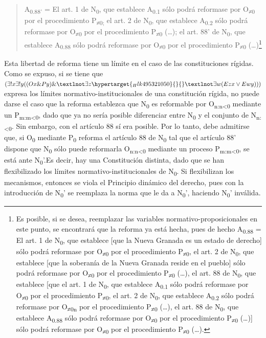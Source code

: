 \documentclass[]{book}
\begin{document}
\begin{quote}
A\textsubscript{0.88'} = El art. 1 de N\textsubscript{0}, que establece
A\textsubscript{0.1} sólo podrá reformase por O\textsubscript{≠0} por el
procedimiento P\textsubscript{≠0;} el art. 2 de N\textsubscript{0}, que
establece A\textsubscript{0.2} sólo podrá reformase por
O\textsubscript{≠0} por el procedimiento P\textsubscript{≠0} (\ldots{});
el art. 88' de N\textsubscript{0}, que establece A\textsubscript{0.88}
sólo podrá reformase por O\textsubscript{≠0} por el procedimiento
P\protect\hypertarget{_Hlk494053794}{}{}\textsubscript{≠0}
(\ldots{})\footnote{Es posible, si se desea, reemplazar las variables
  normativo-proposicionales en este punto, se encontrará que la reforma
  ya está hecha, pues de hecho A\textsubscript{0.88} = El art. 1 de
  N\textsubscript{0}, que establece {[}que la Nueva Granada es un estado
  de derecho{]} sólo podrá reformase por O\textsubscript{≠0} por el
  procedimiento P\textsubscript{≠0}, el art. 2 de N\textsubscript{0},
  que establece {[}que la soberanía de la Nueva Granada reside en el
  pueblo{]} sólo podrá reformase por O\textsubscript{≠0} por el
  procedimiento P\textsubscript{≠0} (\ldots{}), el art. 88 de
  N\textsubscript{0}, que establece {[}que el art. 1 de
  N\textsubscript{0}, que establece A\textsubscript{0.1} sólo podrá
  reformase por O\textsubscript{≠0} por el procedimiento
  P\textsubscript{≠0}, el art. 2 de N\textsubscript{0}, que establece
  A\textsubscript{0.2} sólo podrá reformase por O\textsubscript{≠0n} por
  el procedimiento P\textsubscript{≠0} (\ldots{}), el art. 88 de
  N\textsubscript{0}, que establece A\textsubscript{0.88} sólo podrá
  reformase por O\textsubscript{≠0} por el procedimiento
  P\textsubscript{≠0} (\ldots{}){]} sólo podrá reformase por
  O\textsubscript{≠0} por el procedimiento P\textsubscript{≠0}
  (\ldots{}).}
\end{quote}

Esta libertad de reforma tiene un límite en el caso de las
constituciones rígidas. Como se expuso, si se tiene que $(\exists!x \exists!y ((Ox \&Py) \& ¬\exists z \protect\hypertarget{_Hlk495321050}{}{}¬\exists w (Ezx \lor Ewy)))$
expresa los límites normativo-institucionales de una constitución
rígida, no puede darse el caso que la reforma establezca que
N\textsubscript{0} es reformable por O\textsubscript{n:n\textless{}0}
mediante un P\textsubscript{m:m\textless{}0}, dado que ya no sería
posible diferenciar entre N\textsubscript{0} y el conjunto de
N\textsubscript{n:\textless{}0}. Sin embargo, con el artículo 88 sí era
posible. Por lo tanto, debe admitirse que, si O\textsubscript{0}
mediante P\textsubscript{0} reforma el artículo 88 de N\textsubscript{0}
tal que el artículo 88' dispone que N\textsubscript{0} sólo puede
reformarla O\textsubscript{n:n\textless{}0} mediante un proceso
P\textsubscript{m:m\textless{}0}, se está ante N\textsubscript{0}'.Es
decir, hay una Constitución distinta, dado que se han flexibilizado los
límites normativo-institucionales de N\textsubscript{0}. Si flexibilizan los mecanismos, entonces se viola el Principio dinámico del derecho, pues con la introducción de N\textsubscript{0}' se reemplaza la norma que le da a N\textsubscript{0}', haciendo N\textsubscript{0}' inválida.
\end{document}
